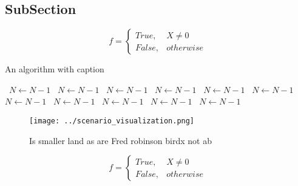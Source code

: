 \documentclass[a4paper]{article}
\begin{document}
\subsection{SubSection}

\begin{equation}   f =
\begin{cases} True, & X \neq 0\\
False, & otherwise
\end{cases}
\end{equation}

\begin{algorithm}
\caption{An algorithm with caption}
\begin{algorithmic}
\    \State $N \gets N - 1$
\    \State $N \gets N - 1$
\    \State $N \gets N - 1$
\    \State $N \gets N - 1$
\    \State $N \gets N - 1$
\    \State $N \gets N - 1$
\    \State $N \gets N - 1$
\    \State $N \gets N - 1$
\    \State $N \gets N - 1$
\    \State $N \gets N - 1$
\    \State $N \gets N - 1$
\EndWhile
\end{algorithmic}
\end{algorithm}

\begin{figure}
\centering
\texttt{[image: ../scenario\_visualization.png]}
\caption{Is smaller land as are Fred robinson birdx not ab
}
\end{figure}
 
\begin{equation}   f =
\begin{cases} True, & X \neq 0\\
False, & otherwise
\end{cases}
\end{equation}
\end{document}
